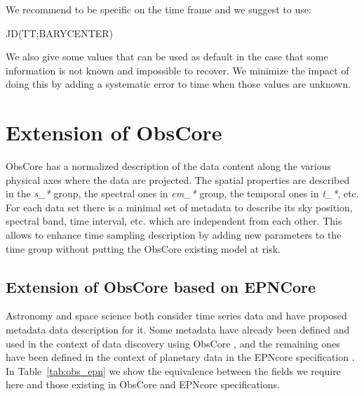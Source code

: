 \documentclass[11pt,a4paper]{ivoa}
\begin{document}
We recommend to be specific on the time frame and we suggest to use:
\begin{center}
  JD(TT;BARYCENTER)
\end{center}
We also give some values that can be used as default in the case that some information is not known and impossible to recover. We minimize the impact of doing this by adding a systematic error to time when those values are unknown.

\section{Extension of ObsCore}
ObsCore has a normalized description of the data content along the various physical axes where the data are projected.
The spatial properties are described in the \emph{s\_*} group, the spectral ones in \emph{em\_*} group, the temporal ones in \emph{t\_*}, etc.
For each data set there is a minimal  set of metadata to describe its sky position, spectral band, time interval, etc. which are independent from each other.
This allows to enhance time sampling description by adding new parameters to the time group without putting the ObsCore existing model at risk.

\subsection{Extension of ObsCore based on EPNCore}
Astronomy and space science both consider time series data and have proposed metadata data description for it. Some metadata have already been defined and used in the context of data discovery using ObsCore \cite{2017ivoa.spec.0509L}, and the remaining ones have been defined in the context of planetary data in the EPNcore specification \cite{2022ivoa.spec.0822E}. In Table~\ref{tab:obs_epn} we show the equivalence between the fields we require here and those existing in  ObsCore and EPNcore specifications.
\end{document}
